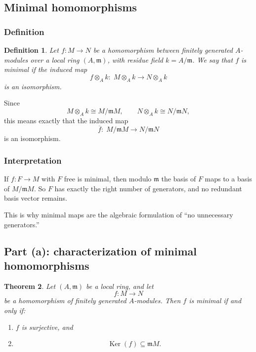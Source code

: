 \documentclass[12pt,a4paper]{article}
\theoremstyle{notespace}
\newtheorem{definition}{Definition}[section]
\DeclareMathOperator{\Ker}{Ker}
\newtheorem{theorem}[definition]{Theorem}
\newcommand{\m}{\mathfrak m}
\begin{document}
\subsection{Minimal homomorphisms}

\subsubsection{Definition}

\begin{definition}
	Let \(f:M\to N\) be a homomorphism between finitely generated \(A\)-modules over a local ring \((A,\m)\), with residue field \(k=A/\m\). We say that \(f\) is \emph{minimal} if the induced map
	\[
	f\otimes_A k:\; M\otimes_A k \longrightarrow N\otimes_A k
	\]
	is an isomorphism.
\end{definition}

Since
\[
M\otimes_A k\cong M/\m M,\qquad N\otimes_A k\cong N/\m N,
\]
this means exactly that the induced map
\[
\overline f:\; M/\m M \longrightarrow N/\m N
\]
is an isomorphism.

\subsubsection{Interpretation}

If \(f:F\to M\) with \(F\) free is minimal, then modulo \(\m\) the basis of \(F\) maps to a basis of \(M/\m M\). So \(F\) has exactly the right number of generators, and no redundant basis vector remains.

This is why minimal maps are the algebraic formulation of ``no unnecessary generators.''

\subsection{Part (a): characterization of minimal homomorphisms}

\begin{theorem}
	Let \((A,\m)\) be a local ring, and let
	\[
	f:M\to N
	\]
	be a homomorphism of finitely generated \(A\)-modules. Then \(f\) is minimal if and only if:
	\begin{enumerate}[label=\textnormal{(\roman*)},leftmargin=2em]
		\item \(f\) is surjective, and
		\item
		\[
		\Ker(f)\subseteq \m M.
		\]
	\end{enumerate}
\end{theorem}
\end{document}
